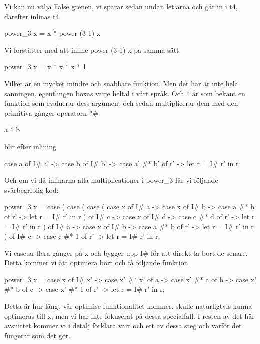 \documentclass[../Optimise]{subfiles}
\begin{document}
Vi kan nu välja False grenen, vi sparar sedan undan let:arna och går in i t4, därefter inlinas t4.

\begin{codeEx}
power_3 x = x * power (3-1) x
\end{codeEx}

Vi forstätter med att inline power (3-1) x på samma sätt.

\begin{codeEx}
power_3 x = x * x * x * 1
\end{codeEx}

Vilket är en mycket mindre och snabbare funktion.
Men det här är inte hela sanningen, egentlingen boxas varje heltal i vårt språk.
 Och * är som bekant en funktion som evaluerar dess argument och sedan multiplicerar
dem med den primitiva gånger operatorn *\#

\begin{codeEx}
a * b
\end{codeEx}

blir efter inlining

\begin{codeEx}
case a of
    { I# a' -> case b of
        { I# b' -> case  a' #* b' of
            { r' -> let r = I# r' in r}}}
\end{codeEx}

Och om vi då inlinarna alla multiplicationer i power\_3 får vi följande svårbegriblig kod:
\begin{codeEx}
power_3 x = case 
    ( case 
        ( case 
            ( case x of
                { I# a -> case x of
                    { I# b -> case a #* b of
                        { r' -> let r = I# r' in r}}}
            ) of
            { I# c -> case x of
                { I# d -> case c #* d of
                    { r' -> let r = I# r' in r}}}                
         ) of
         { I# a -> case x of
              { I# b -> case a #* b of
                   { r' -> let r = I# r' in r}}}
    ) of
        { I# c -> case c #* 1 of
            { r' -> let r = I# r' in r}};                                     
\end{codeEx}


Vi case:ar flera gånger på x och bygger upp I\# för att direkt ta bort de senare.
 Detta kommer vi att optimera bort och få följande funktion.

\begin{codeEx}
power_3 x = case x of
    { I# x' -> case x' #* x' of
        { a -> case x' #* a of
            { b -> case x' #* b of
                { c -> case x' #* 1 of
                    { r' -> let r = I# r' in r}}}}};
\end{codeEx}

Detta är hur långt vår optimise funktionalitet kommer.  skulle naturligtvis
kunna optimeras till x, men vi har inte fokuserat på dessa specialfall.
I resten av det här avsnittet kommer vi i detalj förklara vart och ett av dessa 
steg och varför det fungerar som det gör.
\end{document}

